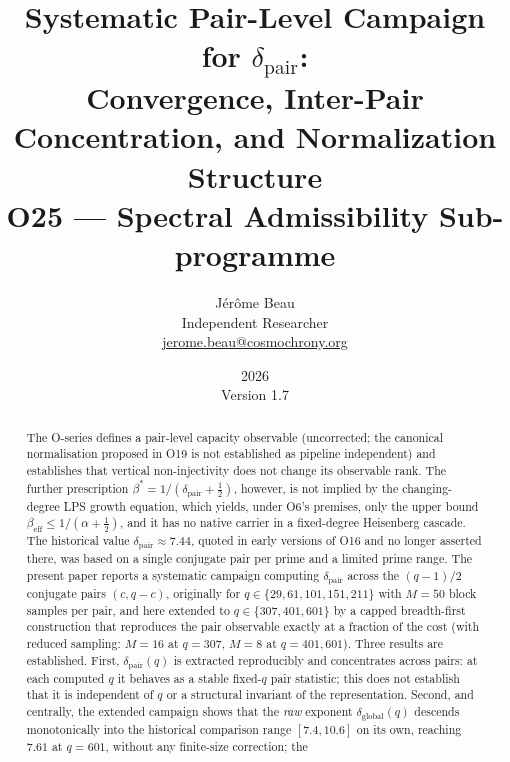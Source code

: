 \documentclass[11pt,a4paper]{article}
\theoremstyle{definition}
\newcommand{\dpair}{\delta_{\mathrm{pair}}}
\newcommand{\bstar}{\beta^{*}}
\begin{document}
  \title{Systematic Pair-Level Campaign for $\delta_{\mathrm{pair}}$:\\
  Convergence, Inter-Pair Concentration, and Normalization Structure\\[4pt]
  {\normalsize O25 --- Spectral Admissibility Sub-programme}}
  \author{J\'er\^ome Beau\\[2pt]
  \small Independent Researcher\\
  \small \href{mailto:jerome.beau@cosmochrony.org}{jerome.beau@cosmochrony.org}}
  \date{2026\\[2pt]\small Version 1.7}
  \maketitle

  \begin{abstract}
    The O-series defines a pair-level capacity observable (uncorrected; the canonical normalisation
    proposed in O19 is not established as pipeline independent) and establishes that
    vertical non-injectivity does not change its observable rank.
    The further prescription $\bstar=1/(\dpair+\tfrac12)$, however, is not implied by the
    changing-degree LPS growth equation, which yields, under O6's premises, only the upper bound
    $\beta_{\mathrm{eff}} \le 1/(\alpha+\tfrac12)$, and it has no native carrier in a
    fixed-degree Heisenberg cascade.
    The historical value $\dpair \approx 7.44$, quoted in early versions of O16 and no longer
    asserted there, was based on a single conjugate pair per prime and a limited prime range.
    The present paper reports a systematic campaign computing $\dpair$ across the
    $(q-1)/2$ conjugate pairs $(c, q-c)$, originally for $q \in \{29, 61, 101, 151, 211\}$ with
    $M = 50$ block samples per pair, and here extended to $q \in \{307, 401, 601\}$ by a capped
    breadth-first construction that reproduces the pair observable exactly at a fraction of the
    cost (with reduced sampling: $M = 16$ at $q = 307$, $M = 8$ at $q = 401, 601$).
    Three results are established.
    First, $\dpair(q)$ is extracted reproducibly and concentrates across pairs: at each computed $q$ it
    behaves as a stable fixed-$q$ pair statistic; this does not establish that it is independent of
    $q$ or a structural invariant of the representation.
    Second, and centrally, the extended campaign shows that the \emph{raw} exponent
    $\delta_{\mathrm{global}}(q)$ descends monotonically into the historical comparison range
    $[7.4, 10.6]$ on its own, reaching $7.61$ at $q = 601$, without any finite-size correction; the

\end{abstract}
\end{document}
